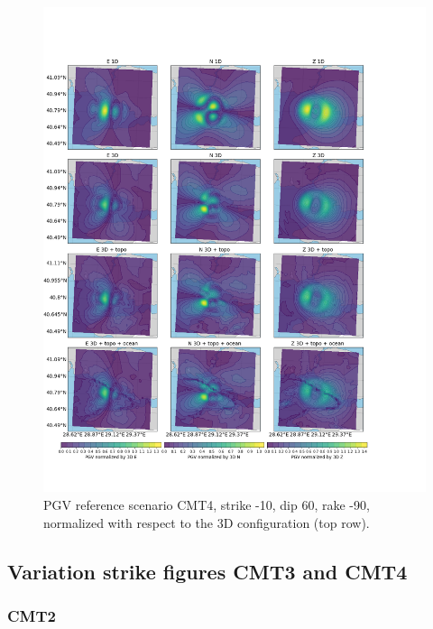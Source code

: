 \documentclass[../Text/00main.tex]{subfiles}
\begin{document}
\begin{figure}[h]
    \centering
    \includegraphics[width=1\linewidth]{images_results/Ref_scenarios_normalized_sc4.png}
    \caption{PGV reference scenario CMT4, strike -10, dip 60, rake -90, normalized with respect to the 3D configuration (top row).}
    \label{fig:ref_CMT4}
\end{figure}

\FloatBarrier

\subsection{Variation strike figures CMT3 and CMT4}

\subsubsection{CMT2}
\end{document}
